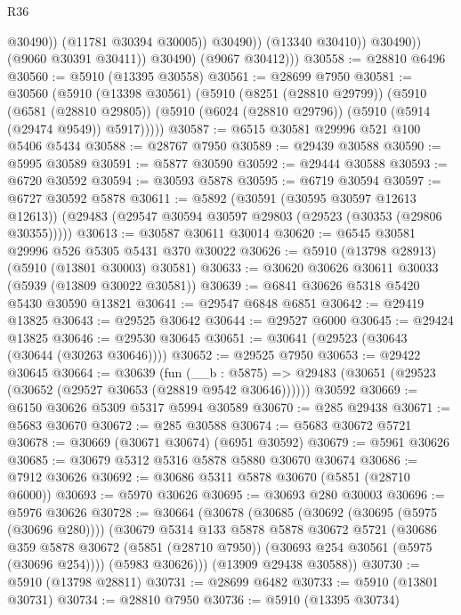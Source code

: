 \begin{lexlean}{R36}
\begin{coremodule}
                            @30490))
                        (@11781 @30394 @30005))
                      @30490))
                  (@13340 @30410))
                @30490))
            (@9060 @30391 @30411))
          @30490)
        (@9067 @30412)))
@30558 := @28810 @6496
@30560 := @5910 (@13395 @30558)
@30561 := @28699 @7950
@30581 := @30560
    (@5910
      (@13398 @30561)
      (@5910
        (@8251 (@28810 @29799))
        (@5910
          (@6581 (@28810 @29805))
          (@5910 (@6024 (@28810 @29796)) (@5910 (@5914 (@29474 @9549)) @5917)))))
@30587 := @6515 @30581 @29996 @521 @100 @5406 @5434
@30588 := @28767 @7950
@30589 := @29439 @30588
@30590 := @5995 @30589
@30591 := @5877 @30590
@30592 := @29444 @30588
@30593 := @6720 @30592
@30594 := @30593 @5878
@30595 := @6719 @30594
@30597 := @6727 @30592 @5878
@30611 := @5892
    (@30591 (@30595 @30597 @12613 @12613))
    (@29483 (@29547 @30594 @30597 @29803 (@29523 (@30353 (@29806 @30355)))))
@30613 := @30587 @30611 @30014
@30620 := @6545 @30581 @29996 @526 @5305 @5431 @370 @30022
@30626 := @5910 (@13798 @28913) (@5910 (@13801 @30003) @30581)
@30633 := @30620 @30626 @30611 @30033 (@5939 (@13809 @30022 @30581))
@30639 := @6841 @30626 @5318 @5420 @5430 @30590 @13821
@30641 := @29547 @6848 @6851
@30642 := @29419 @13825
@30643 := @29525 @30642
@30644 := @29527 @6000
@30645 := @29424 @13825
@30646 := @29530 @30645
@30651 := @30641 (@29523 (@30643 (@30644 (@30263 @30646))))
@30652 := @29525 @7950
@30653 := @29422 @30645
@30664 := @30639
    (fun (__b : @5875) => @29483 (@30651 (@29523 (@30652 (@29527 @30653 (@28819 @9542 @30646))))))
    @30592
@30669 := @6150 @30626 @5309 @5317 @5994 @30589
@30670 := @285 @29438
@30671 := @5683 @30670
@30672 := @285 @30588
@30674 := @5683 @30672 @5721
@30678 := @30669 (@30671 @30674) (@6951 @30592)
@30679 := @5961 @30626
@30685 := @30679 @5312 @5316 @5878 @5880 @30670 @30674
@30686 := @7912 @30626
@30692 := @30686 @5311 @5878 @30670 (@5851 (@28710 @6000))
@30693 := @5970 @30626
@30695 := @30693 @280 @30003
@30696 := @5976 @30626
@30728 := @30664
    (@30678
      (@30685
        (@30692 (@30695 (@5975 (@30696 @280))))
        (@30679
          @5314
          @133
          @5878
          @5878
          @30672
          @5721
          (@30686
            @359
            @5878
            @30672
            (@5851 (@28710 @7950))
            (@30693 @254 @30561 (@5975 (@30696 @254))))
          (@5983 @30626)))
      (@13909 @29438 @30588))
@30730 := @5910 (@13798 @28811)
@30731 := @28699 @6482
@30733 := @5910 (@13801 @30731)
@30734 := @28810 @7950
@30736 := @5910 (@13395 @30734)

\end{coremodule}
\end{lexlean}

